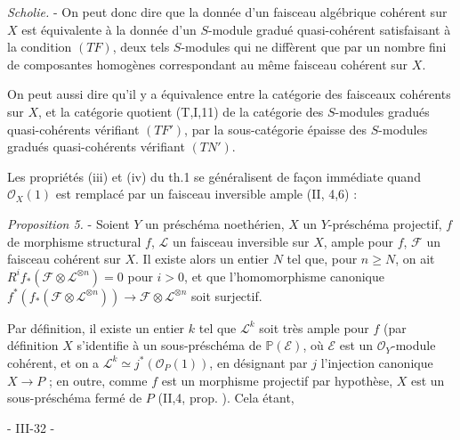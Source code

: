 \emph{Scholie.} - On peut donc dire que la donnée d'un faisceau algébrique cohérent sur $X$ est équivalente à la donnée d'un $S$-module gradué quasi-cohérent satisfaisant à la condition $(TF)$, deux tels $S$-modules qui ne diffèrent que par un nombre fini de composantes homogènes correspondant au même faisceau cohérent sur $X$.

On peut aussi dire qu'il y a équivalence entre la catégorie des faisceaux cohérents sur $X$, et la catégorie quotient (T,I,11) de la catégorie des $S$-modules gradués quasi-cohérents vérifiant $(TF')$, par la sous-catégorie épaisse des $S$-modules gradués quasi-cohérents vérifiant $(TN')$.

Les propriétés (iii) et (iv) du th.1 se généralisent de façon immédiate quand $\mathcal{O}_X(1)$ est remplacé par un faisceau inversible ample (II, 4,6) :

\emph{Proposition 5.} - Soient $Y$ un préschéma noethérien, $X$ un $Y$-préschéma projectif, $f$ de morphisme structural $f$, $\mathcal{L}$ un faisceau inversible sur $X$, ample pour $f$, $\mathcal{F}$ un faisceau cohérent sur $X$. Il existe alors un entier $N$ tel que, pour $n \ge N$, on ait $R^i f_*(\mathcal{F} \otimes \mathcal{L}^{\otimes n}) = 0$ pour $i > 0$, et que l'homomorphisme canonique $f^*(f_*(\mathcal{F} \otimes \mathcal{L}^{\otimes n})) \to \mathcal{F} \otimes \mathcal{L}^{\otimes n}$ soit surjectif.

Par définition, il existe un entier $k$ tel que $\mathcal{L}^k$ soit très ample pour $f$ (par définition $X$ s'identifie à un sous-préschéma de $\mathbb{P}(\mathcal{E})$, où $\mathcal{E}$ est un $\mathcal{O}_Y$-module cohérent, et on a $\mathcal{L}^k \simeq j^*(\mathcal{O}_P(1))$, en désignant par $j$ l'injection canonique $X \to P$ ; en outre, comme $f$ est un morphisme projectif par hypothèse, $X$ est un sous-préschéma fermé de $P$ (II,4, prop. ). Cela étant,

\newpage


- III-32 -

